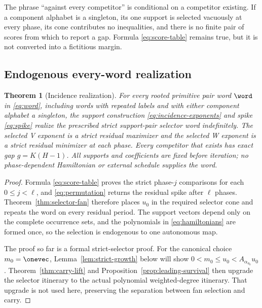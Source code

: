 \documentclass[11pt,letterpaper]{article}
\newtheorem{theorem}{Theorem}[section]
\theoremstyle{definition}
\theoremstyle{remark}
\numberwithin{equation}{section}
\begin{document}
The phrase ``against every competitor'' is conditional on a competitor
existing.  If a component alphabet is a singleton, its one support is
selected vacuously at every phase, its cone contributes no inequalities, and
there is no finite pair of scores from which to report a gap.  Formula
\eqref{eq:score-table} remains true, but it is not converted into a fictitious
margin.

\subsection{Endogenous every-word realization}

\begin{theorem}[Incidence realization]
\label{thm:incidence-realization}
For every rooted primitive pair word \(\word\) in \eqref{eq:word}, including
words with repeated labels and with either component alphabet a singleton,
the support construction \eqref{eq:incidence-exponents} and spike
\eqref{eq:spike} realize the prescribed strict support-pair selector word
indefinitely.  The selected V exponent is a strict residual maximizer and
the selected W exponent is a strict residual minimizer at each phase.  Every
competitor that exists has exact gap \(g=K(H-1)\).  All supports and
coefficients are fixed before iteration; no phase-dependent Hamiltonian or
external schedule supplies the word.
\end{theorem}

\begin{proof}
Formula \eqref{eq:score-table} proves the strict phase-\(j\) comparisons for
each \(0\leq j<\ell\), and \eqref{eq:permutation} returns the residual spike
after \(\ell\) phases.  Theorem~\ref{thm:selector-fan} therefore places
\(u_0\) in the required selector cone and repeats the word on every residual
period.  The support vectors depend only on the complete occurrence sets,
and the polynomials in \eqref{eq:hamiltonians} are formed once, so the
selection is endogenous to one autonomous map.

The proof so far is a formal strict-selector proof.  For the canonical
choice \(m_0=\onevec\), Lemma~\ref{lem:strict-growth} below will show
\(0<m_0\leq u_0<A_{\alpha_{a_0}}u_0\).  Theorem~\ref{thm:carry-lift} and
Proposition~\ref{prop:leading-survival} then upgrade the selector itinerary
to the actual polynomial weighted-degree itinerary.  That upgrade is not
used here, preserving the separation between fan selection and carry.
\end{proof}
\end{document}
